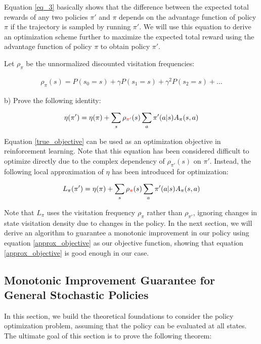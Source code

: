 Equation \ref{eq_3} basically shows that the difference between the expected total rewards of any two policies $\pi'$ and $\pi$ depends on the advantage function of policy $\pi$ if the trajectory is sampled by running $\pi'$. We will use this equation to derive an optimization scheme further to maximize the expected total reward using the advantage function of policy $\pi$ to obtain policy $\pi'$.

Let $\rho_\pi$ be the unnormalized discounted visitation frequencies:

\begin{align*}
    \rho_\pi(s) = P(s_0 = s)+\gamma P(s_1 = s) + \gamma^2 P(s_2 = s) + \ldots
\end{align*}

b) Prove the following identity:

\begin{align}\label{true_objective}
    \eta(\pi') = \eta(\pi) + \sum_{s}\rho_{\textcolor{red}{\pi'}}(s)\sum_{a}\pi'(a|s)A_{\pi}(s, a)
\end{align}

Equation \ref{true_objective} can be used as an optimization objective in reinforcement learning. Note that this equation has been considered difficult to optimize directly due to the complex dependency of $\rho_{\pi'}(s)$ on $\pi'$. Instead, the following local approximation of $\eta$ has been introduced for optimization:

\begin{align}\label{approx_objective}
    L_{\pi}(\pi') = \eta(\pi) + \sum_{s}\rho_{\textcolor{red}{\pi}}(s)\sum_{a}\pi'(a|s)A_{\pi}(s, a)
\end{align}

Note that $L_{\pi}$ uses the visitation frequency $\rho_{\pi}$ rather than $\rho_{\pi'}$, ignoring changes in state visitation density due to changes in the policy. In the next section, we will derive an algorithm to guarantee a monotonic improvement in our policy using equation \ref{approx_objective} as our objective function, showing that equation \ref{approx_objective} is good enough in our case.

\subsection{Monotonic Improvement Guarantee for General Stochastic Policies}

In this section, we build the theoretical foundations to consider the policy optimization problem, assuming that the policy can be evaluated at all states. The ultimate goal of this section is to prove the following theorem:

